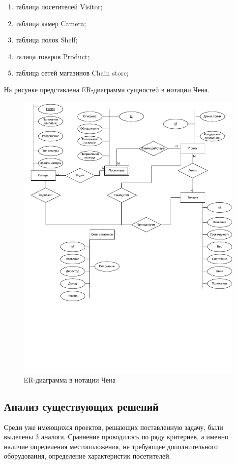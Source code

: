 \begin{enumerate}[label=\arabic*.]
	\item таблица посетителей Visitor;
	\item таблица камер Camera;
	\item таблица полок Shelf;
	\item талица товаров Product;
	\item таблица сетей магазинов Chain store;
\end{enumerate}

На рисунке представлена ER-диаграмма сущностей в нотации Чена.

\begin{figure}[ht!]
	\centering
	\includegraphics[width=0.9\linewidth]{assets/images/ER.drawio.pdf}
	\caption{ER-диаграмма в нотации Чена}
	\label{fig:anal:chen}
\end{figure}
\FloatBarrier

\subsection{Анализ существующих решений}

Среди уже имеющихся проектов, решающих поставленную задачу, были выделены 3 аналога.
Сравнение проводилось по ряду критериев, а именно наличие определения местоположения, 
не требующее дополнительного оборудования, определение характеристик посетителей.

